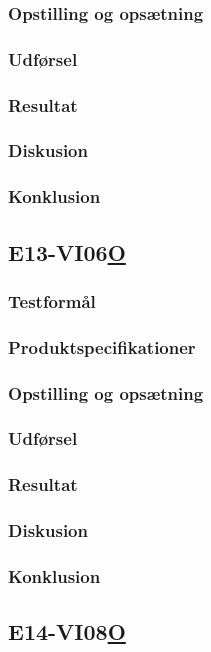 \subsubsection{Opstilling og opsætning}
\subsubsection{Udførsel}
\subsubsection{Resultat}
\subsubsection{Diskusion}
\subsubsection{Konklusion}

\subsection{E13-VI06\underline{O}}
\subsubsection{Testformål}
\subsubsection{Produktspecifikationer}
\subsubsection{Opstilling og opsætning}
\subsubsection{Udførsel}
\subsubsection{Resultat}
\subsubsection{Diskusion}
\subsubsection{Konklusion}

\subsection{E14-VI08\underline{O}}
